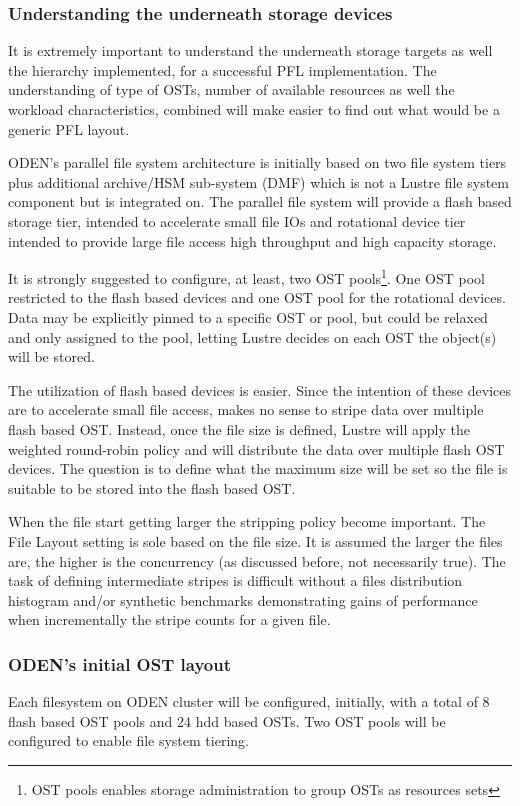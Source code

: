 \documentclass{article}
\begin{document}
\subsubsection{Understanding the underneath storage devices}
It is extremely important to understand the underneath storage targets as well the hierarchy implemented, for a successful PFL implementation. The understanding of type of OSTs, number of available resources as well the workload characteristics, combined will make easier to find out what would be a generic PFL layout. 

ODEN's parallel file system architecture is initially based on two file system tiers plus additional archive/HSM sub-system (DMF) which is not a Lustre file system component but is integrated on. The parallel file system will provide a flash based storage tier, intended to accelerate small file IOs and rotational device tier intended to provide large file access high throughput and high capacity storage.

It is strongly suggested to configure, at least, two OST pools\footnote{OST pools enables storage administration to group OSTs as resources sets}. One OST pool restricted to the flash based devices and one OST pool for the rotational devices. Data may be explicitly pinned to a specific OST or pool, but could be relaxed and only assigned to the pool, letting Lustre decides on each OST the object(s) will be stored. 

The utilization of flash based devices is easier. Since the intention of these devices are to accelerate small file access, makes no sense to stripe data over multiple flash based OST. Instead, once the file size is defined, Lustre will apply the weighted round-robin policy and will distribute the data over multiple flash OST devices. The question is to define what the maximum  size will be set so the file is suitable to be stored into the flash based OST.

When the file start getting larger the stripping policy become important. The File Layout setting is sole based on the file size. It is assumed the larger the files are, the higher is the concurrency (as discussed before, not necessarily true). The task of defining intermediate stripes is difficult without a files distribution histogram and/or synthetic benchmarks demonstrating gains of performance when incrementally the stripe counts for a given file.

\subsubsection{ODEN's initial OST layout}
Each filesystem on ODEN cluster will be configured, initially, with a total of 8 flash based OST pools and 24 hdd based OSTs. Two OST pools will be configured to enable file system tiering. 
\end{document}
